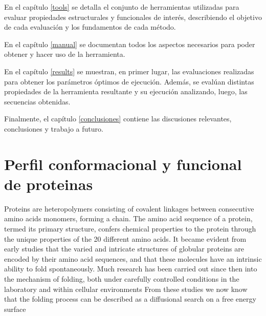 En el capítulo \ref{tools} se detalla el conjunto de herramientas utilizadas para evaluar propiedades estructurales y funcionales de interés, describiendo el objetivo de cada evaluación y los fundamentos de cada método. 

En el capítulo \ref{manual} se documentan todos los aspectos necesarios para poder obtener y hacer uso de la herramienta.

En el capítulo \ref{results} se muestran, en primer lugar, las evaluaciones realizadas para obtener los parámetros óptimos de ejecución. 
Además, se evalúan distintas propiedades de la herramienta resultante y su ejecución analizando, luego, las secuencias obtenidas. 

Finalmente, el capítulo \ref{conclusiones} contiene las discusiones relevantes, conclusiones y trabajo a futuro.































\section{Perfil conformacional y funcional de proteinas}\label{proteinLandscape}

Proteins are heteropolymers consisting of covalent linkages between consecutive amino acids monomers, forming a chain. 
The amino acid sequence of a protein, termed its primary structure, confers chemical properties to the protein through the unique properties of the 20 different amino acids.
It became evident from early studies that the varied and intricate structures of globular proteins are encoded by their amino acid sequences, and that these molecules have an intrinsic ability to fold spontaneously.
Much research has been carried out since then into the mechanism of folding, both under carefully controlled conditions in the laboratory and within cellular environments
From these studies we now know that the folding process can be described as a diffusional search on a free energy surface



